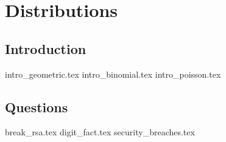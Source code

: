 \documentclass{exam}
\begin{document}
\section{Distributions}
\subsection{Introduction}
{intro_geometric.tex}
{intro_binomial.tex}
{intro_poisson.tex}
\subsection{Questions}
\begin{questions}
{break_rsa.tex}
{digit_fact.tex}
{security_breaches.tex}
\end{questions}
\end{document}
